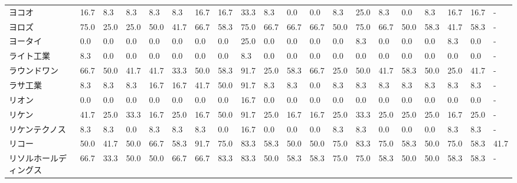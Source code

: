 \begin{tabular}{llllllllllllllllllll}
ヨコオ             &   16.7 &    8.3 &       8.3 &       8.3 &        8.3 &   16.7 &   16.7 &   33.3 &     8.3 &     0.0 &    0.0 &   8.3 &   25.0 &     8.3 &     0.0 &   8.3 &  16.7 &  16.7 &     - \\
ヨロズ             &   75.0 &   25.0 &      25.0 &      50.0 &       41.7 &   66.7 &   58.3 &   75.0 &    66.7 &    66.7 &   66.7 &  50.0 &   75.0 &    66.7 &    50.0 &  58.3 &  41.7 &  58.3 &     - \\
ヨータイ            &    0.0 &    0.0 &       0.0 &       0.0 &        0.0 &    0.0 &    0.0 &   25.0 &     0.0 &     0.0 &    0.0 &   0.0 &    8.3 &     0.0 &     0.0 &   0.0 &   8.3 &   0.0 &     - \\
ライト工業           &    8.3 &    0.0 &       0.0 &       0.0 &        0.0 &    0.0 &    0.0 &    8.3 &     0.0 &     0.0 &    0.0 &   0.0 &    0.0 &     0.0 &     0.0 &   0.0 &   0.0 &   0.0 &     - \\
ラウンドワン          &   66.7 &   50.0 &      41.7 &      41.7 &       33.3 &   50.0 &   58.3 &   91.7 &    25.0 &    58.3 &   66.7 &  25.0 &   50.0 &    41.7 &    58.3 &  50.0 &  25.0 &  41.7 &     - \\
ラサ工業            &    8.3 &    8.3 &       8.3 &      16.7 &       16.7 &   41.7 &   50.0 &   91.7 &     8.3 &     8.3 &    0.0 &   8.3 &    8.3 &     8.3 &     8.3 &   8.3 &   8.3 &   8.3 &     - \\
リオン             &    0.0 &    0.0 &       0.0 &       0.0 &        0.0 &    0.0 &    0.0 &   16.7 &     0.0 &     0.0 &    0.0 &   0.0 &    0.0 &     0.0 &     0.0 &   0.0 &   0.0 &   0.0 &     - \\
リケン             &   41.7 &   25.0 &      33.3 &      16.7 &       25.0 &   16.7 &   50.0 &   91.7 &    25.0 &    16.7 &   16.7 &  25.0 &   33.3 &    25.0 &    25.0 &  25.0 &  16.7 &  25.0 &     - \\
リケンテクノス         &    8.3 &    8.3 &       0.0 &       8.3 &        8.3 &    8.3 &    0.0 &   16.7 &     0.0 &     0.0 &    0.0 &   8.3 &    8.3 &     0.0 &     0.0 &   0.0 &   8.3 &   8.3 &     - \\
リコー             &   50.0 &   41.7 &      50.0 &      66.7 &       58.3 &   91.7 &   75.0 &   83.3 &    58.3 &    50.0 &   50.0 &  75.0 &   83.3 &    75.0 &    58.3 &  50.0 &  75.0 &  58.3 &  41.7 \\
リソルホールディングス     &   66.7 &   33.3 &      50.0 &      50.0 &       66.7 &   66.7 &   83.3 &   83.3 &    50.0 &    58.3 &   58.3 &  75.0 &   75.0 &    58.3 &    50.0 &  50.0 &  58.3 &  58.3 &     - \\

\end{tabular}
